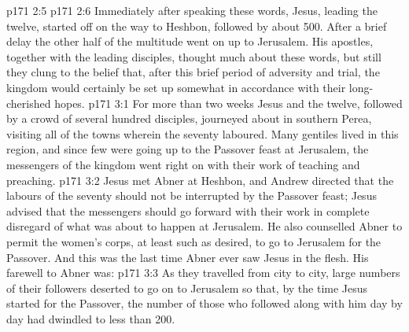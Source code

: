 \vs p171 2:5 
\vs p171 2:6 \pc Immediately after speaking these words, Jesus, leading the twelve, started off on the way to Heshbon, followed by about 500. After a brief delay the other half of the multitude went on up to Jerusalem. His apostles, together with the leading disciples, thought much about these words, but still they clung to the belief that, after this brief period of adversity and trial, the kingdom would certainly be set up somewhat in accordance with their long\hyp{}cherished hopes.
\vs p171 3:1 For more than two weeks Jesus and the twelve, followed by a crowd of several hundred disciples, journeyed about in southern Perea, visiting all of the towns wherein the seventy laboured. Many gentiles lived in this region, and since few were going up to the Passover feast at Jerusalem, the messengers of the kingdom went right on with their work of teaching and preaching.
\vs p171 3:2 Jesus met Abner at Heshbon, and Andrew directed that the labours of the seventy should not be interrupted by the Passover feast; Jesus advised that the messengers should go forward with their work in complete disregard of what was about to happen at Jerusalem. He also counselled Abner to permit the women’s corps, at least such as desired, to go to Jerusalem for the Passover. And this was the last time Abner ever saw Jesus in the flesh. His farewell to Abner was: 
\vs p171 3:3 As they travelled from city to city, large numbers of their followers deserted to go on to Jerusalem so that, by the time Jesus started for the Passover, the number of those who followed along with him day by day had dwindled to less than 200.
